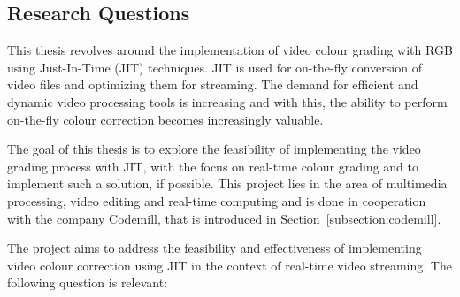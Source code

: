 \documentclass[../MasterThesis.tex]{subfiles}
\begin{document}
	
	
	
	
	
	
	
	
	
	
	
	
	
	
	
	\subsection{Research Questions} \label{subsection:research%
		TODOquestions}
	
	
	This thesis revolves around the implementation of video colour grading with RGB using Just-In-Time (JIT) techniques. 	
	JIT is used for on-the-fly conversion of video files and optimizing them for streaming. 
	The demand for efficient and dynamic video processing tools is increasing and with this, the ability to perform on-the-fly colour correction becomes increasingly valuable. 
	
	The goal of this thesis is to explore the feasibility of implementing the video grading process with JIT, with the focus on real-time colour grading and to implement such a solution, if possible. This project lies in the area of multimedia processing, video editing and real-time computing and is done in cooperation with the company Codemill, that is introduced in Section~\ref{subsection:codemill}.
	
	
	
	The project aims to address the feasibility and effectiveness of implementing video colour correction using JIT in the context of real-time video streaming. The following question is relevant:
	
\end{document}
